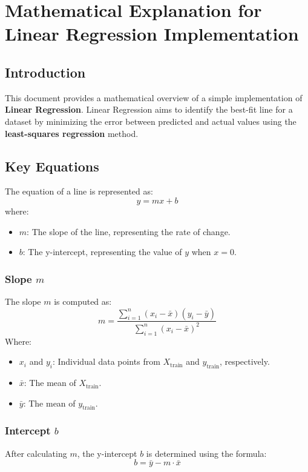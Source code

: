 \documentclass{article}
\begin{document}
\section*{Mathematical Explanation for Linear Regression Implementation}

\subsection*{Introduction}
This document provides a mathematical overview of a simple implementation of \textbf{Linear Regression}. Linear Regression aims to identify the best-fit line for a dataset by minimizing the error between predicted and actual values using the \textbf{least-squares regression} method.

\subsection*{Key Equations}
The equation of a line is represented as:
\[ y = mx + b \]
where:
\begin{itemize}
    \item \( m \): The slope of the line, representing the rate of change.
    \item \( b \): The y-intercept, representing the value of \( y \) when \( x = 0 \).
\end{itemize}

\subsubsection*{Slope \( m \)}
The slope \( m \) is computed as:
\[
m = \frac{\sum_{i=1}^n (x_i - \bar{x})(y_i - \bar{y})}{\sum_{i=1}^n (x_i - \bar{x})^2}
\]
Where:
\begin{itemize}
    \item \( x_i \) and \( y_i \): Individual data points from \( X_{\text{train}} \) and \( y_{\text{train}} \), respectively.
    \item \( \bar{x} \): The mean of \( X_{\text{train}} \).
    \item \( \bar{y} \): The mean of \( y_{\text{train}} \).
\end{itemize}

\subsubsection*{Intercept \( b \)}
After calculating \( m \), the y-intercept \( b \) is determined using the formula:
\[
b = \bar{y} - m \cdot \bar{x}
\]
\end{document}
